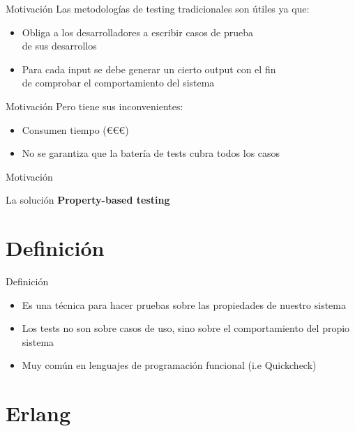 \documentclass{beamer}
\begin{document}
    \begin{frame}{Motivación}
      Las metodologías de testing tradicionales son útiles ya que:
      \begin{itemize}
        \item Obliga a los desarrolladores a escribir casos de prueba\\
        de sus desarrollos
        \item Para cada input se debe generar un cierto output con el fin\\
        de comprobar el comportamiento del sistema
      \end{itemize}
    \end{frame}

    \begin{frame}{Motivación}
      Pero tiene sus inconvenientes:
      \begin{itemize}
        \item Consumen tiempo (€€€)
        \item No se garantiza que la batería de tests cubra todos los casos
      \end{itemize}
    \end{frame}

    \begin{frame}{Motivación}
      \begin{exampleblock}{La solución}
        \textbf{Property-based testing}
      \end{exampleblock}
    \end{frame}
  \section{Definición}
    \begin{frame}{Definición}
      \begin{itemize}
        \item Es una técnica para hacer pruebas sobre las propiedades de nuestro sistema
        \item Los tests no son sobre casos de uso, sino sobre el comportamiento del propio sistema
        \item Muy común en lenguajes de programación funcional (i.e Quickcheck)
      \end{itemize}
    \end{frame}
  \section{Erlang}
\end{document}

